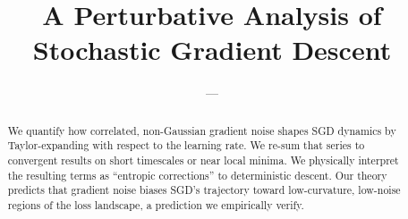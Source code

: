 



    \title{A Perturbative Analysis of Stochastic Gradient Descent}
    \author {%
        ---\\%
    }
    \affiliations{%
        ---%
    }
    \maketitle
    
    \begin{abstract}
        We quantify how correlated, non-Gaussian gradient noise
        shapes SGD dynamics by Taylor-expanding with respect to the learning
        rate.  We re-sum that series to convergent
        results on short timescales or near local minima.  We physically
        interpret the resulting terms as ``entropic corrections'' to
        deterministic descent.  Our theory predicts that gradient noise biases
        SGD's trajectory toward low-curvature, low-noise regions of the loss
        landscape, a prediction we empirically verify.
    \end{abstract}
    
